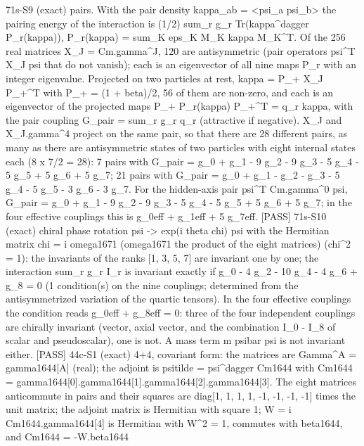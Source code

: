 \documentclass[
  10pt,
]{article}
\newenvironment{Shaded}{}{}
\newcommand{\NormalTok}[1]{#1}
\begin{document}
\begin{Shaded}
\begin{Highlighting}[]
\NormalTok{[PASS] 71s{-}S9  (exact) pairs. With the pair density kappa\_ab = \textless{}psi\_a psi\_b\textgreater{} the pairing energy of the interaction is (1/2) sum\_r g\_r Tr(kappa\^{}dagger P\_r(kappa)), P\_r(kappa) = sum\_K eps\_K M\_K kappa M\_K\^{}T. Of the 256 real matrices X\_J = Cm.gamma\^{}J, 120 are antisymmetric (pair operators psi\^{}T X\_J psi that do not vanish); each is an eigenvector of all nine maps P\_r with an integer eigenvalue. Projected on two particles at rest, kappa = P\_+ X\_J P\_+\^{}T with P\_+ = (1 + beta)/2, 56 of them are non{-}zero, and each is an eigenvector of the projected maps P\_+ P\_r(kappa) P\_+\^{}T = q\_r kappa, with the pair coupling G\_pair = sum\_r g\_r q\_r (attractive if negative). X\_J and X\_J.gamma\^{}4 project on the same pair, so that there are 28 different pairs, as many as there are antisymmetric states of two particles with eight internal states each (8 x 7/2 = 28): 7 pairs with G\_pair = g\_0 + g\_1 {-} 9 g\_2 {-} 9 g\_3 {-} 5 g\_4 {-} 5 g\_5 + 5 g\_6 + 5 g\_7; 21 pairs with G\_pair = g\_0 + g\_1 {-} g\_2 {-} g\_3 {-} 5 g\_4 {-} 5 g\_5 {-} 3 g\_6 {-} 3 g\_7. For the hidden{-}axis pair psi\^{}T Cm.gamma\^{}0 psi, G\_pair = g\_0 + g\_1 {-} 9 g\_2 {-} 9 g\_3 {-} 5 g\_4 {-} 5 g\_5 + 5 g\_6 + 5 g\_7; in the four effective couplings this is g\_0eff + g\_1eff + 5 g\_7eff.}
\NormalTok{[PASS] 71s{-}S10  (exact) chiral phase rotation psi {-}\textgreater{} exp(i theta chi) psi with the Hermitian matrix chi = i omega1671 (omega1671 the product of the eight matrices) (chi\^{}2 = 1): the invariants of the ranks [1, 3, 5, 7] are invariant one by one; the interaction sum\_r g\_r I\_r is invariant exactly if g\_0 {-} 4 g\_2 {-} 10 g\_4 {-} 4 g\_6 + g\_8 = 0 (1 condition(s) on the nine couplings; determined from the antisymmetrized variation of the quartic tensors). In the four effective couplings the condition reads g\_0eff + g\_8eff = 0: three of the four independent couplings are chirally invariant (vector, axial vector, and the combination I\_0 {-} I\_8 of scalar and pseudoscalar), one is not. A mass term m psibar psi is not invariant either.}
\NormalTok{[PASS] 44c{-}S1  (exact) 4+4, covariant form: the matrices are Gamma\^{}A = gamma1644[A] (real); the adjoint is psitilde = psi\^{}dagger Cm1644 with Cm1644 = gamma1644[0].gamma1644[1].gamma1644[2].gamma1644[3]. The eight matrices anticommute in pairs and their squares are diag[1, 1, 1, 1, {-}1, {-}1, {-}1, {-}1] times the unit matrix; the adjoint matrix is Hermitian with square 1; W = i Cm1644.gamma1644[4] is Hermitian with W\^{}2 = 1, commutes with beta1644, and Cm1644 = {-}W.beta1644}

\end{Highlighting}
\end{Shaded}
\end{document}
